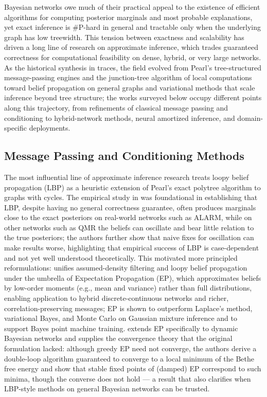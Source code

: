 Bayesian networks owe much of their practical appeal to the existence of efficient algorithms for computing posterior marginals and most probable explanations, yet exact inference is \#P-hard in general and tractable only when the underlying graph has low treewidth. This tension between exactness and scalability has driven a long line of research on approximate inference, which trades guaranteed correctness for computational feasibility on dense, hybrid, or very large networks. As the historical synthesis in \cite{revista2026network} traces, the field evolved from Pearl's tree-structured message-passing engines and the junction-tree algorithm of local computations toward belief propagation on general graphs and variational methods that scale inference beyond tree structure; the works surveyed below occupy different points along this trajectory, from refinements of classical message passing and conditioning to hybrid-network methods, neural amortized inference, and domain-specific deployments.

\subsection{Message Passing and Conditioning Methods}
The most influential line of approximate inference research treats loopy belief propagation (LBP) as a heuristic extension of Pearl's exact polytree algorithm to graphs with cycles. The empirical study in \cite{murphy2013loopy} was foundational in establishing that LBP, despite having no general correctness guarantee, often produces marginals close to the exact posteriors on real-world networks such as ALARM, while on other networks such as QMR the beliefs can oscillate and bear little relation to the true posteriors; the authors further show that naive fixes for oscillation can make results worse, highlighting that empirical success of LBP is case-dependent and not yet well understood theoretically. This motivated more principled reformulations: \cite{minka2013expectation} unifies assumed-density filtering and loopy belief propagation under the umbrella of Expectation Propagation (EP), which approximates beliefs by low-order moments (e.g., mean and variance) rather than full distributions, enabling application to hybrid discrete-continuous networks and richer, correlation-preserving messages; EP is shown to outperform Laplace's method, variational Bayes, and Monte Carlo on Gaussian mixture inference and to support Bayes point machine training. \cite{heskes2012expectation} extends EP specifically to dynamic Bayesian networks and supplies the convergence theory that the original formulation lacked: although greedy EP need not converge, the authors derive a double-loop algorithm guaranteed to converge to a local minimum of the Bethe free energy and show that stable fixed points of (damped) EP correspond to such minima, though the converse does not hold --- a result that also clarifies when LBP-style methods on general Bayesian networks can be trusted.

